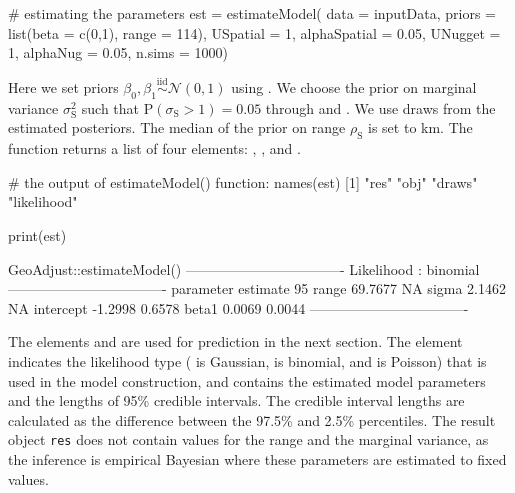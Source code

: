 \begin{example}
# estimating the parameters
est = estimateModel(
      data = inputData, 
      priors = list(beta = c(0,1), range = 114), 
                    USpatial = 1, alphaSpatial = 0.05,
                    UNugget = 1, alphaNug = 0.05,
      n.sims = 1000)
\end{example}

Here we set priors $\beta_0, \beta_1 \overset{\text{iid}}{\sim}\mathcal{N}(0, 1)$ using . We choose the prior on marginal variance $\sigma_\mathrm{S}^2$ such that $\mathrm{P}(\sigma_\mathrm{S} > 1) = 0.05$ through  and . We use  draws from the estimated posteriors. The median of the prior on range $\rho_\mathrm{S}$ is set to  km. The function  returns a list of four elements: , ,  and . 

\begin{example}
# the output of estimateModel() function:
names(est)
[1] "res"        "obj"        "draws"      "likelihood"

print(est)

GeoAdjust::estimateModel() 
----------------------------------
Likelihood :          binomial
----------------------------------
parameter estimate    95%
range     69.7677     NA
sigma     2.1462      NA
intercept -1.2998     0.6578
beta1     0.0069      0.0044
----------------------------------
\end{example}

The elements  and  are used for prediction in the next section. The element 
 indicates the likelihood type ( is Gaussian,  is binomial, and  is Poisson) that is used in the model construction, and  contains the estimated model parameters and the lengths of 95\% credible intervals. The credible interval lengths are calculated as the difference between the 97.5\%  and 2.5\%  percentiles. The result object \texttt{res} does not contain  values for the range and the marginal variance, as the inference is empirical Bayesian where these parameters are estimated to fixed values.

